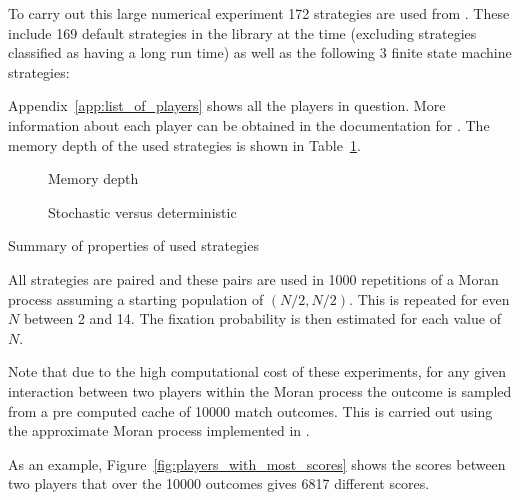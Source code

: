\documentclass{article}
\begin{document}
{To carry out this large numerical experiment 172 strategies are used from
\cite{axelrodproject}. These include 169 default strategies in the library at
the time (excluding strategies classified as having a long run time) as well as
the following 3 finite state machine strategies:


Appendix~\ref{app:list_of_players} shows all the players in question. More
information about each player can be obtained in the documentation for
\cite{axelrodproject}. The memory depth of the used strategies is shown in
Table~\ref{tbl:memory_depth_count}.

\begin{table}[!hbtp]
    \centering
        \begin{subfigure}[t]{\textwidth}
            \centering
                
                \caption{Memory depth}
                \label{tbl:memory_depth_count}
        \end{subfigure}
        \vspace{.5cm}

        \begin{subfigure}[t]{\textwidth}
            \centering
                
                \caption{Stochastic versus deterministic}
                \label{tbl:stochastic_count}
        \end{subfigure}
        \caption{Summary of properties of used strategies}
\end{table}

All strategies are paired and these pairs are used in 1000 repetitions of a
Moran process assuming a starting population of \((N/2, N/2)\). This is repeated
for even \(N\) between 2 and 14. The fixation probability is then estimated for
each value of \(N\).

Note that due to the high computational cost of these experiments, for any given
interaction between two players within the Moran process the outcome is sampled
from a pre computed cache of 10000 match outcomes. This is carried out using the
approximate Moran process implemented in \cite{axelrodproject}.

As an example, Figure~\ref{fig:players_with_most_scores} shows the scores
between two players that over the 10000 outcomes gives 6817 different scores.

}
\end{document}

